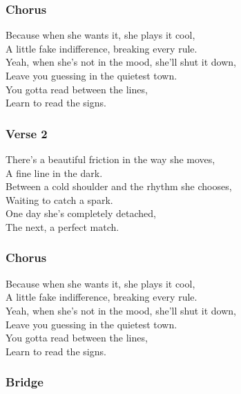 \subsubsection{\hspace{0pt}Chorus}\label{chorus}

\hspace{0pt}Because when she wants it, she plays it cool,\\
A little fake indifference, breaking every rule.\\
Yeah, when she's not in the mood, she'll shut it down,\\
Leave you guessing in the quietest town.\\
You gotta read between the lines,\\
Learn to read the signs.

\subsubsection{Verse 2}\label{verse-2}

\hspace{0pt}There's a beautiful friction in the way she moves,\\
A fine line in the dark.\\
Between a cold shoulder and the rhythm she chooses,\\
Waiting to catch a spark.\\
One day she's completely detached,\\
The next, a perfect match.

\subsubsection{\hspace{0pt}Chorus}\label{chorus-1}

\hspace{0pt}Because when she wants it, she plays it cool,\\
A little fake indifference, breaking every rule.\\
Yeah, when she's not in the mood, she'll shut it down,\\
Leave you guessing in the quietest town.\\
You gotta read between the lines,\\
Learn to read the signs.

\subsubsection{Bridge}\label{bridge}

